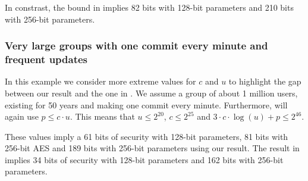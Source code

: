 In constrast, the bound in \cite{ttkem} implies 82 bits with 128-bit parameters and 210 bits with 256-bit parameters.

\subsubsection{Very large groups with one commit every minute and frequent updates} In this example we consider more extreme values for $c$ and $u$ to highlight the gap between our result and the one in \cite{ttkem}. We assume a group of about 1 million users, existing for 50 years and making one commit every minute. Furthermore, will again use $p \le c \cdot u$. This means that $u \le 2^{20}$, $c \le 2^{25}$ and $3 \cdot c \cdot \log(u) + p \le 2^{46}$.

These values imply a 61 bits of security with 128-bit parameters, 81 bits with 256-bit AES and 189 bits with 256-bit parameters using our result. The result in \cite{ttkem} implies 34 bits of security with 128-bit parameters and 162 bits with 256-bit parameters.

